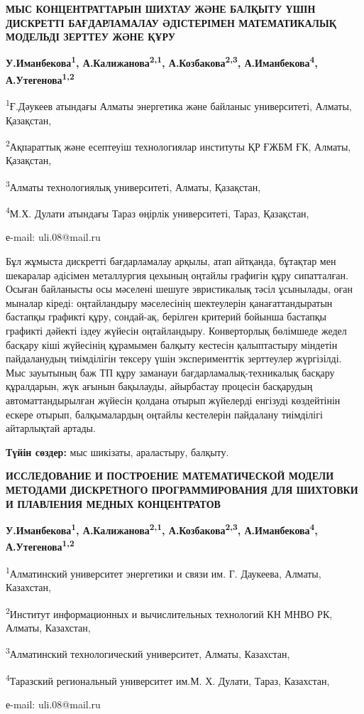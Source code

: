 \begin{center}
{\large\bfseries МЫС КОНЦЕНТРАТТАРЫН ШИХТАУ ЖӘНЕ БАЛҚЫТУ ҮШІН ДИСКРЕТТІ
БАҒДАРЛАМАЛАУ ӘДІСТЕРІМЕН МАТЕМАТИКАЛЫҚ МОДЕЛЬДІ ЗЕРТТЕУ ЖӘНЕ ҚҰРУ}

{\bfseries У.Иманбекова\textsuperscript{1}\envelope,
А.Калижанова\textsuperscript{2,1}, А.Козбакова\textsuperscript{2,3},
А.Иманбекова\textsuperscript{4}, А.Утегенова\textsuperscript{1,2}}

\textsuperscript{1}Ғ.Дәукеев атындағы Алматы энергетика және байланыс
университеті, Алматы, Қазақстан,

\textsuperscript{2}Ақпараттық және есептеуіш технологиялар институты ҚР
ҒЖБМ ҒК, Алматы, Қазақстан,

\textsuperscript{3}Алматы технологиялық университеті, Алматы, Қазақстан,

\textsuperscript{4}М.Х. Дулати атындағы Тараз өңірлік университеті,
Тараз, Қазақстан,

е-mail: uli.08@mail.ru
\end{center}

Бұл жұмыста дискретті бағдарламалау арқылы, атап айтқанда, бұтақтар мен
шекаралар әдісімен металлургия цехының оңтайлы графигін құру
сипатталған. Осыған байланысты осы мәселені шешуге эвристикалық тәсіл
ұсынылады, оған мыналар кіреді: оңтайландыру мәселесінің шектеулерін
қанағаттандыратын бастапқы графикті құру, сондай-ақ, берілген критерий
бойынша бастапқы графикті дәйекті іздеу жүйесін оңтайландыру.
Конверторлық бөлімшеде жедел басқару кіші жүйесінің құрамымен балқыту
кестесін қалыптастыру міндетін пайдаланудың тиімділігін тексеру үшін
эксперименттік зерттеулер жүргізілді. Мыс зауытының баж ТП құру заманауи
бағдарламалық-техникалық басқару құралдарын, жүк ағынын бақылауды,
айырбастау процесін басқарудың автоматтандырылған жүйесін қолдана отырып
жүйелерді енгізуді көздейтінін ескере отырып, балқымалардың оңтайлы
кестелерін пайдалану тиімділігі айтарлықтай артады.

{\bfseries Түйін сөздер:} мыс шикізаты, араластыру, балқыту.
\newpage
\begin{center}
{\large\bfseries ИССЛЕДОВАНИЕ И ПОСТРОЕНИЕ МАТЕМАТИЧЕСКОЙ МОДЕЛИ МЕТОДАМИ
ДИСКРЕТНОГО ПРОГРАММИРОВАНИЯ ДЛЯ ШИХТОВКИ И ПЛАВЛЕНИЯ МЕДНЫХ
КОНЦЕНТРАТОВ}

{\bfseries У.Иманбекова\textsuperscript{1}\envelope,
А.Калижанова\textsuperscript{2,1}, А.Козбакова\textsuperscript{2,3},
А.Иманбекова\textsuperscript{4}, А.Утегенова\textsuperscript{1,2}}

\textsuperscript{1}Алматинский университет энергетики и связи им. Г.
Даукеева, Алматы, Казахстан,

\textsuperscript{2}Институт информационных и вычислительных технологий
КН МНВО РК, Алматы, Казахстан,

\textsuperscript{3}Алматинский технологический университет, Алматы,
Казахстан,

\textsuperscript{4}Таразский региональный университет им.М. Х. Дулати,
Тараз, Казахстан,

е-mail: uli.08@mail.ru
\end{center}

